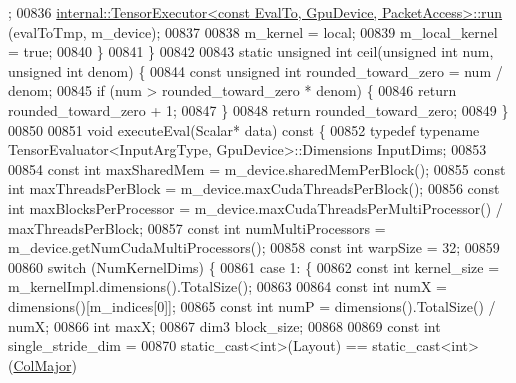 \begin{DoxyCode}
      ;
00836       \hyperlink{class_eigen_1_1internal_1_1_tensor_executor}{internal::TensorExecutor<const EvalTo, GpuDevice, PacketAccess>::run}
      (evalToTmp, m\_device);
00837 
00838       m\_kernel = local;
00839       m\_local\_kernel = \textcolor{keyword}{true};
00840     \}
00841   \}
00842 
00843   \textcolor{keyword}{static} \textcolor{keywordtype}{unsigned} \textcolor{keywordtype}{int} ceil(\textcolor{keywordtype}{unsigned} \textcolor{keywordtype}{int} num, \textcolor{keywordtype}{unsigned} \textcolor{keywordtype}{int} denom) \{
00844     \textcolor{keyword}{const} \textcolor{keywordtype}{unsigned} \textcolor{keywordtype}{int} rounded\_toward\_zero = num / denom;
00845     \textcolor{keywordflow}{if} (num > rounded\_toward\_zero * denom) \{
00846       \textcolor{keywordflow}{return} rounded\_toward\_zero + 1;
00847     \}
00848     \textcolor{keywordflow}{return} rounded\_toward\_zero;
00849   \}
00850 
00851   \textcolor{keywordtype}{void} executeEval(Scalar* data)\textcolor{keyword}{ const }\{
00852     \textcolor{keyword}{typedef} \textcolor{keyword}{typename} TensorEvaluator<InputArgType, GpuDevice>::Dimensions InputDims;
00853 
00854     \textcolor{keyword}{const} \textcolor{keywordtype}{int} maxSharedMem = m\_device.sharedMemPerBlock();
00855     \textcolor{keyword}{const} \textcolor{keywordtype}{int} maxThreadsPerBlock = m\_device.maxCudaThreadsPerBlock();
00856     \textcolor{keyword}{const} \textcolor{keywordtype}{int} maxBlocksPerProcessor = m\_device.maxCudaThreadsPerMultiProcessor() / maxThreadsPerBlock;
00857     \textcolor{keyword}{const} \textcolor{keywordtype}{int} numMultiProcessors = m\_device.getNumCudaMultiProcessors();
00858     \textcolor{keyword}{const} \textcolor{keywordtype}{int} warpSize = 32;
00859 
00860     \textcolor{keywordflow}{switch} (NumKernelDims) \{
00861       \textcolor{keywordflow}{case} 1: \{
00862         \textcolor{keyword}{const} \textcolor{keywordtype}{int} kernel\_size = m\_kernelImpl.dimensions().TotalSize();
00863 
00864         \textcolor{keyword}{const} \textcolor{keywordtype}{int} numX = dimensions()[m\_indices[0]];
00865         \textcolor{keyword}{const} \textcolor{keywordtype}{int} numP = dimensions().TotalSize() / numX;
00866         \textcolor{keywordtype}{int} maxX;
00867         dim3 block\_size;
00868 
00869         \textcolor{keyword}{const} \textcolor{keywordtype}{int} single\_stride\_dim =
00870             \textcolor{keyword}{static\_cast<}\textcolor{keywordtype}{int}\textcolor{keyword}{>}(Layout) == static\_cast<int>(\hyperlink{group__enums_ggaacded1a18ae58b0f554751f6cdf9eb13a0cbd4bdd0abcfc0224c5fcb5e4f6669a}{ColMajor})

\end{DoxyCode}
